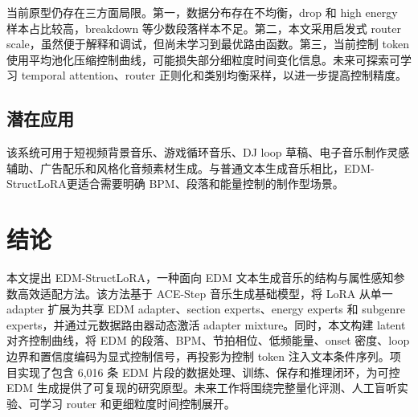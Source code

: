 \documentclass[UTF8,a4paper,zihao=-4,fontset=none]{ctexart}
\newcommand{\modelname}{EDM-StructLoRA}
\begin{document}
当前原型仍存在三方面局限。第一，数据分布存在不均衡，drop 和 high energy 样本占比较高，breakdown 等少数段落样本不足。第二，本文采用启发式 router scale，虽然便于解释和调试，但尚未学习到最优路由函数。第三，当前控制 token 使用平均池化压缩控制曲线，可能损失部分细粒度时间变化信息。未来可探索可学习 temporal attention、router 正则化和类别均衡采样，以进一步提高控制精度。

\subsection{潜在应用}

该系统可用于短视频背景音乐、游戏循环音乐、DJ loop 草稿、电子音乐制作灵感辅助、广告配乐和风格化音频素材生成。与普通文本生成音乐相比，\modelname 更适合需要明确 BPM、段落和能量控制的制作型场景。

\section{结论}

本文提出 \modelname，一种面向 EDM 文本生成音乐的结构与属性感知参数高效适配方法。该方法基于 ACE-Step 音乐生成基础模型，将 LoRA 从单一 adapter 扩展为共享 EDM adapter、section experts、energy experts 和 subgenre experts，并通过元数据路由器动态激活 adapter mixture。同时，本文构建 latent 对齐控制曲线，将 EDM 的段落、BPM、节拍相位、低频能量、onset 密度、loop 边界和置信度编码为显式控制信号，再投影为控制 token 注入文本条件序列。项目实现了包含 6,016 条 EDM 片段的数据处理、训练、保存和推理闭环，为可控 EDM 生成提供了可复现的研究原型。未来工作将围绕完整量化评测、人工盲听实验、可学习 router 和更细粒度时间控制展开。
\end{document}
